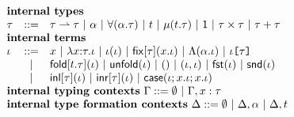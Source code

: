 $\begin{array}{lcl}%
\multicolumn{3}{>{$}l<{$}}{\textbf{internal types}}\\
\ity & ::= & \multicolumn{1}{l}{\iparr{\ity}{\ity} ~|~ \alpha ~|~ \iforall{\alpha}{\ity} ~|~ t ~|~ \imu{t}{\ity} ~|~ \iunit ~|~ \iprod{\ity}{\ity} ~|~ \isum{\ity}{\ity}}\\
\multicolumn{3}{>{$}l<{$}}{\textbf{internal terms}}\\
\itm & ::= & \multicolumn{1}{l}{x ~|~ \ilam{\ity}{x}{\itm} ~|~ \iap{\itm}{\itm} ~|~ \ifix{\ity}{x}{\itm} ~|~ \iLam{\alpha}{\itm} ~|~ \iAp{\ity}{\itm}}\\
& ~|~ & \multicolumn{1}{l}{\ifold{t}{\ity}{\itm} ~|~ \iunfold{\itm} ~|~ \itriv ~|~ \ipair{\itm}{\itm} ~|~ \ifst{\itm} ~|~ \isnd{\itm}}\\
& ~|~ & \iinl{\ity}{\itm} ~|~ \iinr{\ity}{\itm} ~|~ \icase{\itm}{x}{\itm}{x}{\itm}\\
\multicolumn{3}{l}{\textbf{internal typing contexts}~\Gamma ::= \emptyset ~|~ \Gamma, x : \tau}\\
\multicolumn{3}{l}{\textbf{internal type formation contexts}~\Delta ::= \emptyset ~|~ \Delta, \alpha ~|~ \Delta, t}\\
\end{array}%
$